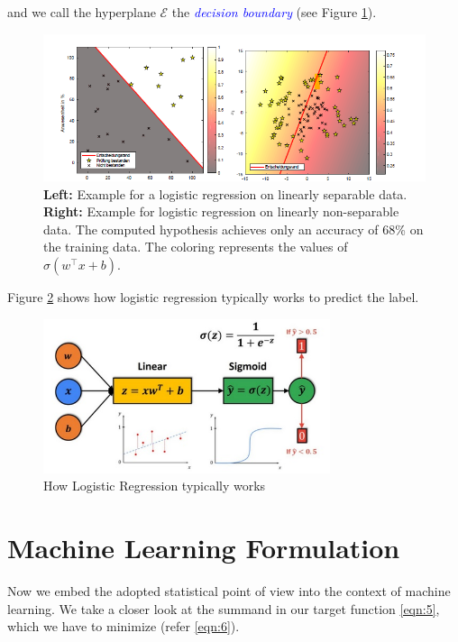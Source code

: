 and we call the hyperplane $\mathcal{E}$ the \textcolor{blue}{\emph{decision boundary}} (see Figure \ref{fig:2}).

\begin{figure}[h!]
    \centering
    \includegraphics[width=1.1\textwidth]{images/figure2.png}
    \caption{
        \textbf{Left:} Example for a logistic regression on linearly separable data.
        \textbf{Right:} Example for logistic regression on linearly non-separable data. The computed hypothesis achieves only an accuracy of 68\% on the training data. The coloring represents the values of $\sigma(w^\top x + b)$.
    }
    \label{fig:2}
\end{figure}

Figure \ref{fig:3} shows how logistic regression typically works to predict the label.

\begin{figure}[h!]
    \centering
    \includegraphics[width=0.75\textwidth]{images/figure3.jpg}
    \caption{How Logistic Regression typically works}
    \label{fig:3}
\end{figure}

\section{Machine Learning Formulation}
Now we embed the adopted statistical point of view into the context of machine learning. We take a closer look at the summand in our target function \ref{eqn:5}, which we have to minimize (refer \ref{eqn:6}).

